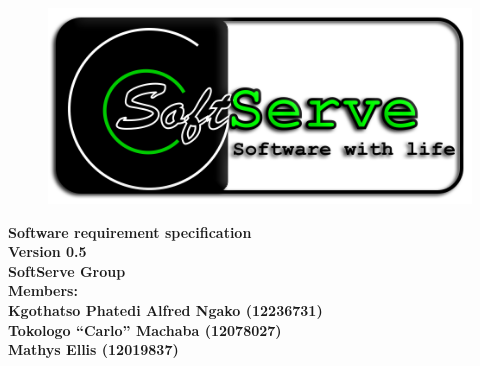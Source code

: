 \documentclass[12pt]{article}
\newcommand{\Title}{Software requirement specification} %
\begin{document}
	\vspace{4em}
	
	\begin{center}%
	
		\begin{figure}[ht!]
			\centering
			\includegraphics{./Pictures/logo.png}
	 	\end{figure}
		\LARGE \bf \Title \\
		{\bf Version 0.5}\\[4em]
	  	\LARGE {\bf SoftServe Group }\\[1em]
	  	\LARGE {\bf Members:}\\[2em]
	  	\large
	     Kgothatso Phatedi Alfred Ngako	(12236731) \\[1em]
	     Tokologo “Carlo” Machaba			(12078027) \\[1em]
	     Mathys Ellis						(12019837) \\[8em]
	    
	\end{center}%
	
		
\end{document}
